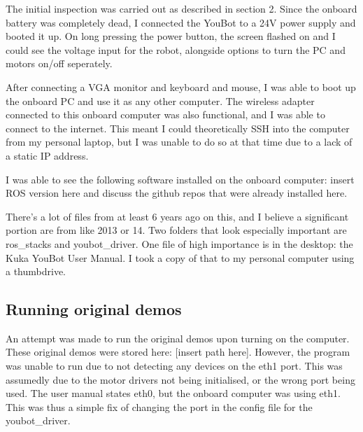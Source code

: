 \documentclass[a4paper, 12pt]{article}
\newif\ifshownotes
\newcommand{\notes}[1]{\ifshownotes\textcolor{blue}{#1}\fi}
\begin{document}
    \notes{furthermore describe issues with software that needed to be fixed, such as the bashrc file, the networking, etc.}

    The initial inspection was carried out as described in section 2. Since the onboard battery was completely dead, I connected the YouBot to a 24V power supply and booted it up. On long pressing the power button, the screen flashed on and I could see the voltage input for the robot, alongside options to turn the PC and motors on/off seperately. 

    After connecting a VGA monitor and keyboard and mouse, I was able to boot up the onboard PC and use it as any other computer. The wireless adapter connected to this onboard computer was also functional, and I was able to connect to the internet. This meant I could theoretically SSH into the computer from my personal laptop, but I was unable to do so at that time due to a lack of a static IP address.


    
    I was able to see the following software installed on the onboard computer: insert ROS version here and discuss the github repos that were already installed here. 

    There’s a lot of files from at least 6 years ago on this, and I believe a significant portion are from like 2013 or 14. Two folders that look especially important are ros\_stacks and youbot\_driver. One file of high importance is in the desktop: the Kuka YouBot User Manual. I took a copy of that to my personal computer using a thumbdrive.  
    
    \notes{discuss powering up, initial software inspection, static IP issue}
    
    
    \pagebreak

    \subsection{Running original demos}
    \notes{describe fixing network issue, and hten running the original demos.}

    An attempt was made to run the original demos upon turning on the computer. These original demos were stored here: [insert path here].
    However, the program was unable to run due to not detecting any devices on the eth1 port. This was assumedly due to the motor drivers not being initialised, or the wrong port being used. The user manual states eth0, but the onboard computer was using eth1. This was thus a simple fix of changing the port in the config file for the youbot\_driver. 
\end{document}
